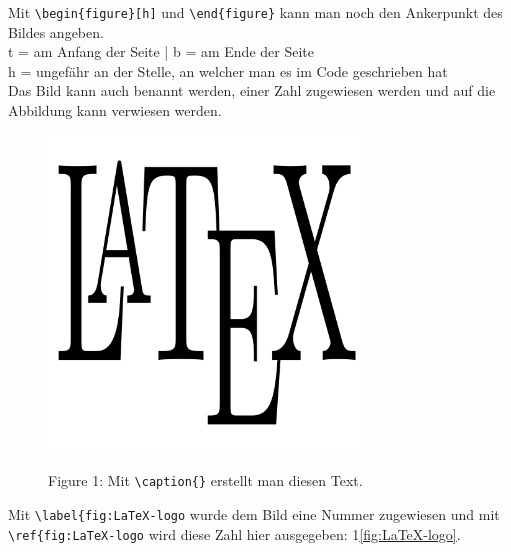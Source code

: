 \documentclass{report}
\begin{document}
Mit {\color{blue}\verb|\begin{figure}[h]|} und {\color{blue}\verb|\end{figure}|} kann man noch den Ankerpunkt des Bildes angeben.\\
{\color{blue}t} = am Anfang der Seite  |  {\color{blue}b} = am Ende der Seite \\
{\color{blue}h} = ungefähr an der Stelle, an welcher man es im Code geschrieben hat\\
\vspace{0.5cm}
Das Bild kann auch benannt werden, einer Zahl zugewiesen werden und auf die Abbildung kann verwiesen werden.\\

\graphicspath{{resources/}}
\begin{figure}[h]
\centering
\includegraphics[width=0.75\textwidth]{LaTeX-logo}
\begin{center}Figure 1: Mit {\color{blue}\verb|\caption{}|} erstellt man diesen Text.\end{center}
\end{figure}
\raggedright
\label{fig:LaTeX-logo}
Mit {\color{blue}\verb|\label{fig:LaTeX-logo|} wurde dem Bild eine Nummer zugewiesen und mit {\color{blue}\verb|\ref{fig:LaTeX-logo|} wird diese Zahl hier ausgegeben: 1\ref{fig:LaTeX-logo}.\\
\end{document}
